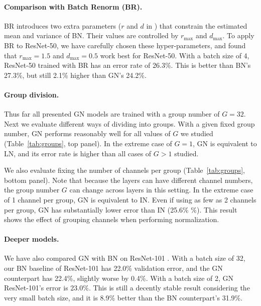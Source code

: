 \documentclass[10pt,twocolumn,letterpaper]{article}
\begin{document}
\paragraph{Comparison with Batch Renorm (BR).}
BR \cite{Ioffe2017} introduces two extra parameters ($r$ and $d$ in \cite{Ioffe2017}) that constrain the estimated mean and variance of BN. Their values are controlled by $r_\text{max}$ and $d_\text{max}$. To apply BR to ResNet-50, we have carefully chosen these hyper-parameters, and found that $r_\text{max}=1.5$ and $d_\text{max}=0.5$ work best for ResNet-50. With a batch size of 4, ResNet-50 trained with BR has an error rate of 26.3\%. This is better than BN's 27.3\%, but still 2.1\% higher than GN's 24.2\%.

\paragraph{Group division.} Thus far all presented GN models are trained with a group number of $G=32$. Next we evaluate different ways of dividing into groups.
With a given fixed group number, GN performs reasonably well for all values of $G$ we studied (Table~\ref{tab:groups}, top panel). In the extreme case of $G=1$, GN is equivalent to LN, and its error rate is higher than all cases of $G>1$ studied.

We also evaluate fixing the number of channels per group (Table~\ref{tab:groups}, bottom panel). Note that because the layers can have different channel numbers, the group number $G$ can change across layers in this setting. In the extreme case of 1 channel per group, GN is equivalent to IN. Even if using as few as 2 channels per group, GN has substantially lower error than IN (25.6\% \%). This result shows the effect of grouping channels when performing normalization.


\paragraph{Deeper models.} We have also compared GN with BN on ResNet-101 \cite{He2016}. With a batch size of 32, our BN baseline of ResNet-101 has 22.0\% validation error, and the GN counterpart has 22.4\%, slightly worse by 0.4\%. With a batch size of 2, GN ResNet-101's error is 23.0\%. This is still a decently stable result considering the very small batch size, and it is 8.9\% better than the BN counterpart's 31.9\%.
\end{document}
